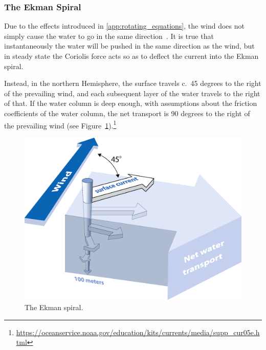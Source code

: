 \subsubsection{The Ekman Spiral}

Due to the effects introduced in \cref{app:rotating_equations},
the wind does not simply cause the water to go in
the same direction~\cite{ekman1905influence}.
It is true that instantaneously the water will be pushed in the same
direction as the wind, but in steady state the Coriolis force acts
so as to deflect the current into the Ekman spiral.

Instead, in the northern Hemisphere,
 the surface travels c.~45 degrees to the
right of the prevailing wind, and each subsequent
layer of the water travels to the right of that.
If the water column is deep enough, with
assumptions about the friction coefficients of the water column,
the net transport is 90 degrees to the right of the prevailing wind
(see Figure~\ref{fig:ekman}).\footnote{
\url{https://oceanservice.noaa.gov/education/kits/currents/media/supp_cur05e.html}}

\begin{figure}
\includegraphics[width=\linewidth]{images/ekman_spiral.png}
\caption{The Ekman spiral.}
\label{fig:ekman}
\end{figure}
